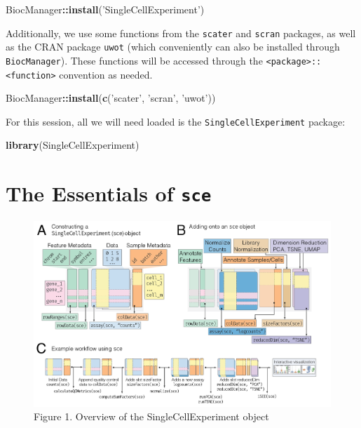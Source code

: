 \documentclass[]{book}
\newenvironment{Shaded}{\begin{snugshade}}{\end{snugshade}}
\newcommand{\KeywordTok}[1]{\textcolor[rgb]{0.13,0.29,0.53}{\textbf{#1}}}
\newcommand{\NormalTok}[1]{#1}
\newcommand{\OperatorTok}[1]{\textcolor[rgb]{0.81,0.36,0.00}{\textbf{#1}}}
\newcommand{\StringTok}[1]{\textcolor[rgb]{0.31,0.60,0.02}{#1}}
\begin{document}
\begin{Shaded}
\begin{Highlighting}[]
\NormalTok{BiocManager}\OperatorTok{::}\KeywordTok{install}\NormalTok{(}\StringTok{'SingleCellExperiment'}\NormalTok{)}
\end{Highlighting}
\end{Shaded}

Additionally, we use some functions from the \texttt{scater} and \texttt{scran} packages, as well as the CRAN package \texttt{uwot} (which conveniently can also be installed through \texttt{BiocManager}). These functions will be accessed through the \texttt{\textless{}package\textgreater{}::\textless{}function\textgreater{}} convention as needed.

\begin{Shaded}
\begin{Highlighting}[]
\NormalTok{BiocManager}\OperatorTok{::}\KeywordTok{install}\NormalTok{(}\KeywordTok{c}\NormalTok{(}\StringTok{'scater'}\NormalTok{, }\StringTok{'scran'}\NormalTok{, }\StringTok{'uwot'}\NormalTok{))}
\end{Highlighting}
\end{Shaded}

For this session, all we will need loaded is the \texttt{SingleCellExperiment} package:

\begin{Shaded}
\begin{Highlighting}[]
\KeywordTok{library}\NormalTok{(SingleCellExperiment)}
\end{Highlighting}
\end{Shaded}

\hypertarget{the-essentials-of-sce}{%
\section{\texorpdfstring{The Essentials of \texttt{sce}}{The Essentials of sce}}\label{the-essentials-of-sce}}

\begin{figure}
\centering
\includegraphics{_img/singlecellexperiment.png}
\caption{Figure 1. Overview of the SingleCellExperiment object}
\end{figure}
\end{document}
